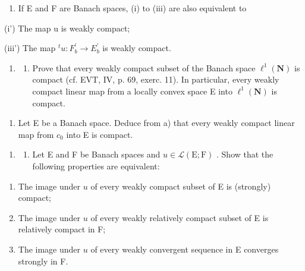 \begin{enumerate}
\def\labelenumi{\alph{enumi})}
\setcounter{enumi}{2}
\tightlist
\item
  If E and F are Banach spaces, (i) to (iii) are also equivalent to
\end{enumerate}

(i') The map u is weakly compact;

(iii') The map \(^{t}u\colon F_{b}^{\prime}\to E_{b}^{\prime}\) is weakly compact.

\begin{enumerate}
\def\labelenumi{\arabic{enumi})}
\setcounter{enumi}{28}
\tightlist
\item
  \begin{enumerate}
  \def\labelenumii{\alph{enumii})}
  \tightlist
  \item
    Prove that every weakly compact subset of the Banach space \(\ell^{1}(\mathbf{N})\) is compact (cf. EVT, IV, p. 69, exerc. 11). In particular, every weakly compact linear map from a locally convex space E into \(\ell^{1}(\mathbf{N})\) is compact.
  \end{enumerate}
\end{enumerate}

\begin{enumerate}
\def\labelenumi{\alph{enumi})}
\setcounter{enumi}{1}
\tightlist
\item
  Let E be a Banach space. Deduce from a) that every weakly compact linear map from \(c_{0}\) into E is compact.
\end{enumerate}

\begin{enumerate}
\def\labelenumi{\arabic{enumi})}
\setcounter{enumi}{29}
\tightlist
\item
  \begin{enumerate}
  \def\labelenumii{\alph{enumii})}
  \tightlist
  \item
    Let E and F be Banach spaces and \(u \in \mathcal{L}(\mathrm{E};\mathrm{F})\) . Show that the following properties are equivalent:
  \end{enumerate}
\end{enumerate}

\begin{enumerate}
\def\labelenumi{(\roman{enumi})}
\item
  The image under \(u\) of every weakly compact subset of E is (strongly) compact;
\item
  The image under \(u\) of every weakly relatively compact subset of E is relatively compact in F;
\item
  The image under \(u\) of every weakly convergent sequence in E converges strongly in F.
\end{enumerate}

